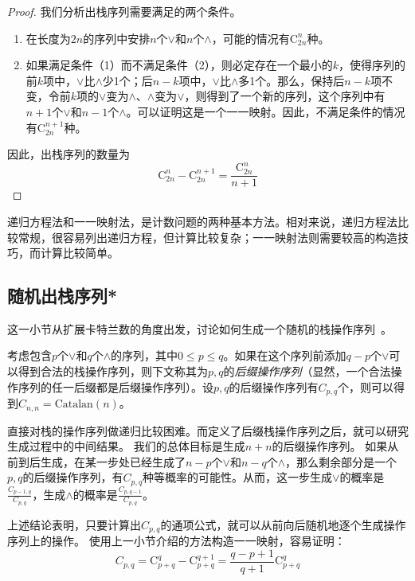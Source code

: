 \begin{proof}

我们分析出栈序列需要满足的两个条件。

\begin{enumerate}
    \item 在长度为$2n$的序列中安排$n$个$\lor$和$n$个$\land$，可能的情况有$\mathrm{C}_{2n}^n$种。
    \item 如果满足条件（1）而不满足条件（2），则必定存在一个最小的$k$，使得序列的前$k$项中，$\lor$比$\land$少1个；后$n-k$项中，$\lor$比$\land$多1个。那么，保持后$n-k$项不变，令前$k$项的$\lor$变为$\land$、$\land$变为$\lor$，则得到了一个新的序列，这个序列中有$n+1$个$\lor$和$n-1$个$\land$。可以证明这是一个一一映射。因此，不满足条件的情况有$\mathrm{C}_{2n}^{n+1}$种。
\end{enumerate}

因此，出栈序列的数量为
$$\mathrm{C}_{2n}^{n}-\mathrm{C}_{2n}^{n+1}=\frac{\mathrm{C}_{2n}^n}{n+1}$$

    
\end{proof}


递归方程法和一一映射法，是计数问题的两种基本方法。相对来说，递归方程法比较常规，很容易列出递归方程，但计算比较复杂；一一映射法则需要较高的构造技巧，而计算比较简单。

\subsection{随机出栈序列*}
\label{stack:随机出栈序列}
这一小节从扩展卡特兰数的角度出发，讨论如何生成一个随机的栈操作序列~\cite{knuth1997art}。

考虑包含$p$个$\lor$和$q$个$\land$的序列，其中$0\le p\le q $。如果在这个序列前添加$q-p$个$\lor$可以得到合法的栈操作序列，则下文称其为$p,q$的\textit{后缀操作序列}（显然，一个合法操作序列的任一后缀都是后缀操作序列）。设$p,q$的后缀操作序列有$C_{p,q}$个，则可以得到$C_{n,n}=\mathrm{Catalan}(n)$。

直接对栈的操作序列做递归比较困难。而定义了后缀栈操作序列之后，就可以研究生成过程中的中间结果。
我们的总体目标是生成$n+n$的后缀操作序列。
如果从前到后生成，在某一步处已经生成了$n-p$个$\lor$和$n-q$个$\land$，那么剩余部分是一个$p,q$的后缀操作序列，有$C_{p,q}$种等概率的可能性。从而，这一步生成$\lor$的概率是$\frac{C_{p-1,q}}{C_{p,q}}$，生成$\land$的概率是$\frac{C_{p,q-1}}{C_{p,q}}$。

上述结论表明，只要计算出$C_{p,q}$的通项公式，就可以从前向后随机地逐个生成操作序列上的操作。
使用上一小节介绍的方法构造一一映射，容易证明：
$$
C_{p,q}=\mathrm{C}_{p+q}^q-\mathrm{C}_{p+q}^{q+1}=\frac{q-p+1}{q+1}\mathrm{C}_{p+q}^q
$$

